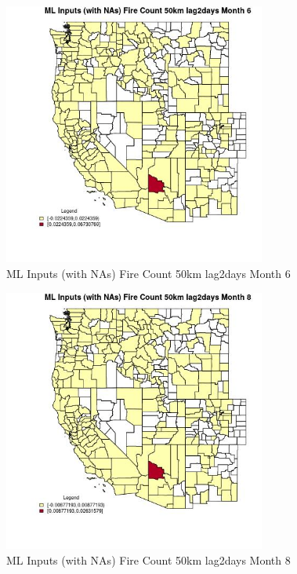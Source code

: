 \begin{figure} 
\centering  
\includegraphics[width=0.77\textwidth]{Code_Outputs/Report_ML_input_PM25_Step4_part_e_de_duplicated_aves_compiled_2019-05-20wNAs_CountyFire_Count_50km_lag2daysmedianMonth6.jpg} 
\caption{\label{fig:Report_ML_input_PM25_Step4_part_e_de_duplicated_aves_compiled_2019-05-20wNAsCountyFire_Count_50km_lag2daysmedianMonth6}ML Inputs (with NAs) Fire Count 50km lag2days Month 6} 
\end{figure} 
 

\begin{figure} 
\centering  
\includegraphics[width=0.77\textwidth]{Code_Outputs/Report_ML_input_PM25_Step4_part_e_de_duplicated_aves_compiled_2019-05-20wNAs_CountyFire_Count_50km_lag2daysmedianMonth8.jpg} 
\caption{\label{fig:Report_ML_input_PM25_Step4_part_e_de_duplicated_aves_compiled_2019-05-20wNAsCountyFire_Count_50km_lag2daysmedianMonth8}ML Inputs (with NAs) Fire Count 50km lag2days Month 8} 
\end{figure} 
 

